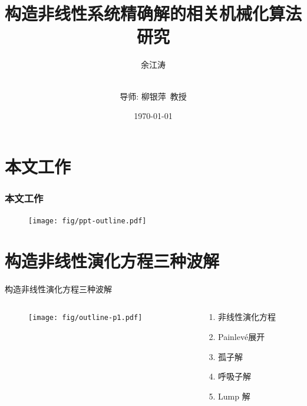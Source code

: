 \documentclass{beamer}
\title[华东师范大学硕士学位论文]{构造非线性系统精确解的相关机械化算法研究}
\author[余江涛]{余江涛 \and \\导师: 柳银萍~教授}
\date{\today}
\newcommand{\Painleve}{Painlev{\'e}}
\begin{document}

\section{本文工作}
\begin{frame}
\frametitle{本文工作}
\begin{figure}
\centering
\texttt{[image: fig/ppt-outline.pdf]} 
\end{figure}
\end{frame}

\section{构造非线性演化方程三种波解}
\begin{frame}{构造非线性演化方程三种波解}
\begin{columns}
\begin{column}{0.5\textwidth}
  \begin{figure}
    \centering
    \texttt{[image: fig/outline-p1.pdf]}
  \end{figure}
\end{column}
\begin{column}{0.5\textwidth}
  \begin{enumerate}
  \item 非线性演化方程
  \item \Painleve{}展开
  \item 孤子解
  \item 呼吸子解 
  \item Lump 解
  \end{enumerate}
\end{column}
\end{columns}
\end{frame}
\end{document}
